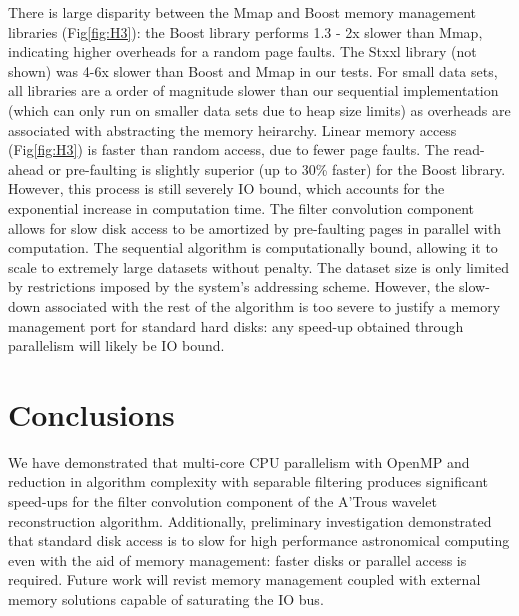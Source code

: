\documentclass[11pt, twoside]{article}
\begin{document}
There is large disparity between the Mmap and Boost memory management libraries (Fig\ref{fig:H3}): the Boost library performs  1.3 - 2x slower than Mmap, indicating higher overheads for a random page faults.   The Stxxl library (not shown) was 4-6x slower than Boost and Mmap in our tests.
For small data sets, all libraries are a order of magnitude slower than our sequential implementation (which can only run on smaller data sets due to heap size limits) as overheads are associated with
abstracting the memory heirarchy.
Linear memory access (Fig\ref{fig:H3}) is faster than random access, due to fewer page faults. The read-ahead or pre-faulting is slightly superior (up to 30\% faster) for the Boost library. However, this process is still severely IO bound,  which accounts for the exponential increase in computation time.
The filter convolution component allows for slow disk access to be amortized by pre-faulting pages in parallel with computation. 
The sequential algorithm is  computationally bound, allowing it to scale to extremely large datasets without penalty. The dataset size is only limited by restrictions imposed by the system's addressing scheme. 
However, the slow-down associated with the rest of the algorithm is too severe to justify a memory management port for standard hard disks:
any speed-up obtained through parallelism will likely be IO bound.

\section{Conclusions}

We have demonstrated that multi-core CPU parallelism with OpenMP and reduction in algorithm complexity with separable filtering produces significant speed-ups
for the filter convolution component of the A'Trous wavelet reconstruction algorithm. Additionally, preliminary investigation demonstrated
that standard disk access is to slow for high performance astronomical computing even with the aid of memory management: faster disks or parallel access is required.  Future work will revist memory management coupled with external memory solutions capable of saturating the IO bus.


\end{document}

